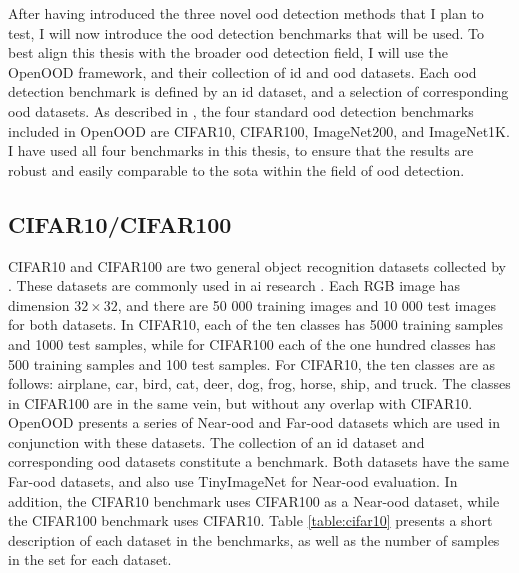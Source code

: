 \documentclass[UKenglish]{uiomasterthesis} %
\theoremstyle{definition}
\begin{document}
After having introduced the three novel \ac{ood} detection methods that I plan to test, I will now introduce the \ac{ood} detection benchmarks that will be used. To best align this thesis with the broader \ac{ood} detection field, I will use the OpenOOD framework, and their collection of \ac{id} and \ac{ood} datasets. Each \ac{ood} detection benchmark is defined by an \ac{id} dataset, and a selection of corresponding \ac{ood} datasets. As described in \cite{openood15}, the four standard \ac{ood} detection benchmarks included in OpenOOD are CIFAR10, CIFAR100, ImageNet200, and ImageNet1K. I have used all four benchmarks in this thesis, to ensure that the results are robust and easily comparable to the \ac{sota} within the field of \ac{ood} detection.

\subsection{CIFAR10/CIFAR100}

CIFAR10 and CIFAR100 are two general object recognition datasets collected by \cite{cifar}. These datasets are commonly used in \ac{ai} research \cite{pouyanfar2018survey}. Each RGB image has dimension $32 \times 32$, and there are 50 000 training images and 10 000 test images for both datasets. In CIFAR10, each of the ten classes has 5000 training samples and 1000 test samples, while for CIFAR100 each of the one hundred classes has 500 training samples and 100 test samples. For CIFAR10, the ten classes are as follows: airplane, car, bird, cat, deer, dog, frog, horse, ship, and truck. The classes in CIFAR100 are in the same vein, but without any overlap with CIFAR10. OpenOOD presents a series of Near-\ac{ood} and Far-\ac{ood} datasets which are used in conjunction with these datasets. The collection of an \ac{id} dataset and corresponding \ac{ood} datasets constitute a benchmark. Both datasets have the same Far-\ac{ood} datasets, and also use TinyImageNet for Near-\ac{ood} evaluation. In addition, the CIFAR10 benchmark uses CIFAR100 as a Near-\ac{ood} dataset, while the CIFAR100 benchmark uses CIFAR10. Table \ref{table:cifar10} presents a short description of each dataset in the benchmarks, as well as the number of samples in the set for each dataset.
\end{document}
